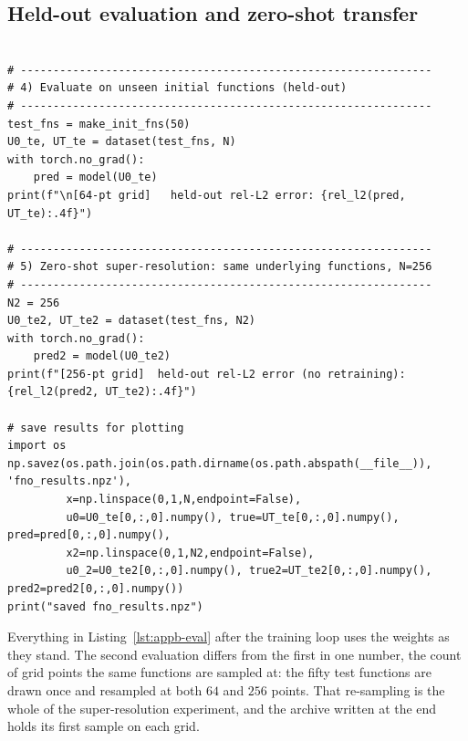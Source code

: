 \subsection{Held-out evaluation and zero-shot transfer}

\begin{lstlisting}[style=appbpystyle, firstnumber=140, caption={\texttt{FNO Worked Example (PyTorch).py}, lines 140--166: held-out evaluation at $N=64$, the zero-shot re-sampling of the same fifty functions at $N=256$ with unchanged weights, and the archive written for the plotting script. Printed verbatim; the block opens on the reference file's blank line 140; the two printed lines supply Table~\ref{tab:appb-measured}.}, label={lst:appb-eval}]

# ---------------------------------------------------------------
# 4) Evaluate on unseen initial functions (held-out)
# ---------------------------------------------------------------
test_fns = make_init_fns(50)
U0_te, UT_te = dataset(test_fns, N)
with torch.no_grad():
    pred = model(U0_te)
print(f"\n[64-pt grid]   held-out rel-L2 error: {rel_l2(pred, UT_te):.4f}")

# ---------------------------------------------------------------
# 5) Zero-shot super-resolution: same underlying functions, N=256
# ---------------------------------------------------------------
N2 = 256
U0_te2, UT_te2 = dataset(test_fns, N2)
with torch.no_grad():
    pred2 = model(U0_te2)
print(f"[256-pt grid]  held-out rel-L2 error (no retraining): {rel_l2(pred2, UT_te2):.4f}")

# save results for plotting
import os
np.savez(os.path.join(os.path.dirname(os.path.abspath(__file__)), 'fno_results.npz'),
         x=np.linspace(0,1,N,endpoint=False),
         u0=U0_te[0,:,0].numpy(), true=UT_te[0,:,0].numpy(), pred=pred[0,:,0].numpy(),
         x2=np.linspace(0,1,N2,endpoint=False),
         u0_2=U0_te2[0,:,0].numpy(), true2=UT_te2[0,:,0].numpy(), pred2=pred2[0,:,0].numpy())
print("saved fno_results.npz")
\end{lstlisting}

Everything in Listing~\ref{lst:appb-eval} after the training loop uses the weights as
they stand. The second evaluation differs from the first in one number, the count of
grid points the same functions are sampled at: the fifty test functions are drawn once
and resampled at both $64$ and $256$ points. That re-sampling is the whole of the
super-resolution experiment, and the archive written at the end holds its first sample
on each grid.

